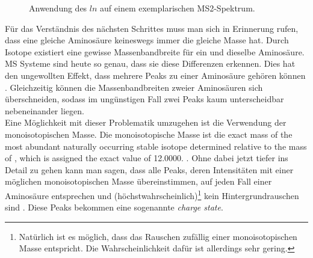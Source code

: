\documentclass[a4paper, 12pt]{article}
\newcommand{\gerquot}[1]{\glqq#1\grqq}
\newcommand{\tikzScale}{1.0}
\begin{document}
\begin{figure}[H]
\begin{minipage}[t]{.45\linewidth}
      \end{minipage}
      \caption{Anwendung des $ ln $ auf einem exemplarischen MS2-Spektrum.}
\end{figure}

Für das Verständnis des nächsten Schrittes muss man sich in Erinnerung rufen, dass eine gleiche Aminosäure keineswegs immer die gleiche Masse hat. Durch Isotope existiert eine gewisse \gerquot{Massenbandbreite} für ein und dieselbe Aminosäure. MS Systeme sind heute so genau, dass sie diese Differenzen erkennen. Dies hat den ungewollten Effekt, dass mehrere Peaks zu einer Aminosäure gehören können \cite{IsotopicDistributionMS}. Gleichzeitig können die \gerquot{Massenbandbreiten} zweier Aminosäuren sich überschneiden, sodass im ungünstigen Fall zwei Peaks kaum unterscheidbar nebeneinander liegen.\\

Eine Möglichkeit mit dieser Problematik umzugehen ist die Verwendung der monoisotopischen Masse. Die monoisotopische Masse ist die \gerquot{[...] exact mass of the most abundant naturally occurring stable isotope determined relative to the mass of \isotope[12]{C}, which is assigned the exact value of 12.0000.} \cite{MonoisotopicMass}. Ohne dabei jetzt tiefer ins Detail zu gehen kann man sagen, dass alle Peaks, deren Intensitäten mit einer möglichen monoisotopischen Masse übereinstimmen, auf jeden Fall einer Aminosäure entsprechen und (höchstwahrscheinlich)\footnote{Natürlich ist es möglich, dass das Rauschen zufällig einer monoisotopischen Masse entspricht. Die Wahrscheinlichkeit dafür ist allerdings sehr gering.} kein Hintergrundrauschen sind \cite{MassDefectMS}. Diese Peaks bekommen eine sogenannte \emph{charge state}.\\
\end{document}
